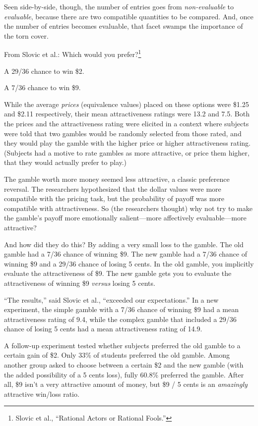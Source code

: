 {
 Seen side-by-side, though, the number of entries goes from
\textit{non-evaluable} to \textit{evaluable}, because there are two
compatible quantities to be compared. And, once the number of entries
becomes evaluable, that facet swamps the importance of the torn cover.}

{
 From Slovic et al.: Which would you prefer?\footnote{Slovic et al., ``Rational Actors or Rational
Fools.''}}

{
 A 29/36 chance to win \$2.}

{
 A 7/36 chance to win \$9.}

{
 While the average \textit{prices} (equivalence values) placed on
these options were \$1.25 and \$2.11 respectively, their mean
attractiveness ratings were 13.2 and 7.5. Both the prices and the
attractiveness rating were elicited in a context where subjects were
told that two gambles would be randomly selected from those rated, and
they would play the gamble with the higher price or higher
attractiveness rating. (Subjects had a motive to rate gambles as more
attractive, or price them higher, that they would actually prefer to
play.)}

{
 The gamble worth more money seemed less attractive, a classic
preference reversal. The researchers hypothesized that the dollar
values were more compatible with the pricing task, but the probability
of payoff was more compatible with attractiveness. So (the researchers
thought) why not try to make the gamble's payoff more
emotionally salient---more affectively evaluable---more attractive?}

{
 And how did they do this? By adding a very small loss to the
gamble. The old gamble had a 7/36 chance of winning \$9. The new gamble
had a 7/36 chance of winning \$9 and a 29/36 chance of losing 5 cents.
In the old gamble, you implicitly evaluate the attractiveness of \$9.
The new gamble gets you to evaluate the attractiveness of winning \$9
\textit{versus} losing 5 cents.}

{
 ``The results,'' said Slovic et
al., ``exceeded our expectations.''
In a new experiment, the simple gamble with a 7/36 chance of winning
\$9 had a mean attractiveness rating of 9.4, while the complex gamble
that included a 29/36 chance of losing 5 cents had a mean
attractiveness rating of 14.9.}

{
 A follow-up experiment tested whether subjects preferred the old
gamble to a certain gain of \$2. Only 33\% of students preferred the
old gamble. Among another group asked to choose between a certain \$2
and the new gamble (with the added possibility of a 5 cents loss),
fully 60.8\% preferred the gamble. After all, \$9 isn't
a very attractive amount of money, but \$9 / 5 cents is an
\textit{amazingly} attractive win/loss ratio.}


